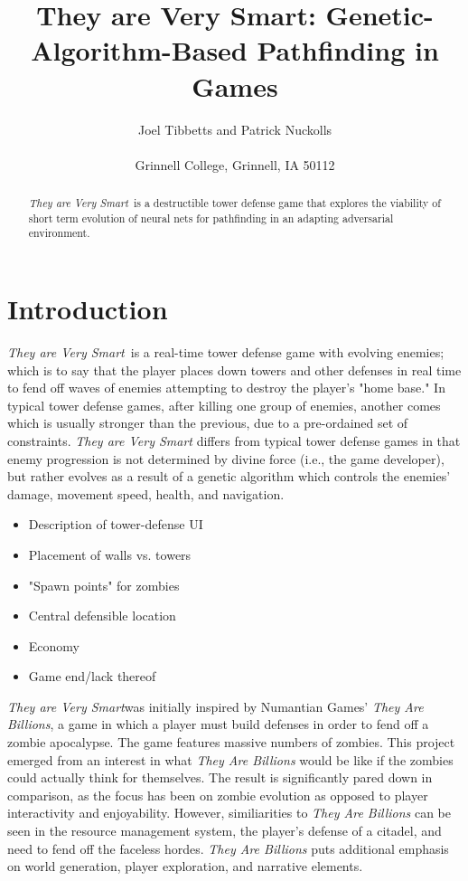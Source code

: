 \documentclass[letterpaper]{article}
\title{They are Very Smart: Genetic-Algorithm-Based Pathfinding in Games}
\author{Joel Tibbetts and Patrick Nuckolls\\
\mbox{}\\
Grinnell College, Grinnell, IA 50112 \\
} %
\def\tavs{\textit{They are Very Smart}}
\begin{document}
\maketitle

\begin{abstract}
 \tavs~is a destructible tower defense game that explores the viability of short term evolution of neural nets for pathfinding in an adapting adversarial environment. 
\end{abstract}

\section{Introduction}
\tavs~is a real-time tower defense game with evolving enemies; which is to say that the player places down towers and other defenses in real time to fend off waves of enemies attempting to destroy the player's "home base." In typical tower defense games, after killing one group of enemies, another comes which is usually stronger than the previous, due to a pre-ordained set of constraints. \textit{They are Very Smart} differs from typical tower defense games in that enemy progression is not determined by divine force (i.e., the game developer), but rather evolves as a result of a genetic algorithm which controls the enemies' damage, movement speed, health, and navigation.

\begin{itemize}
    \item Description of tower-defense UI
    \item Placement of walls vs. towers
    \item "Spawn points" for zombies
    \item Central defensible location
    \item Economy
    \item Game end/lack thereof
\end{itemize}


\tavs was initially inspired by Numantian Games' \textit{They Are Billions}, a game in which a player must build defenses in order to fend off a zombie apocalypse. The game features massive numbers of zombies. This project emerged from an interest in what \textit{They Are Billions} would be like if the zombies could actually think for themselves. The result is significantly pared down in comparison, as the focus has been on zombie evolution as opposed to player interactivity and enjoyability. However, similiarities to \textit{They Are Billions} can be seen in the resource management system, the player's defense of a citadel, and need to fend off the faceless hordes. \textit{They Are Billions} puts additional emphasis on world generation, player exploration, and narrative elements.
\end{document}
